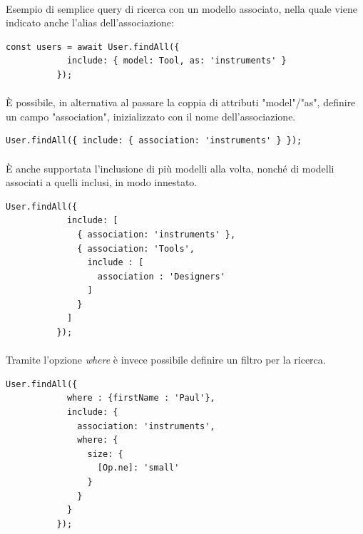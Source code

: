 \documentclass[a4paper, 12pt]{report}
\begin{document}
        \paragraph*{}
        Esempio di semplice query di ricerca con un modello associato, nella quale viene indicato anche l'alias dell'associazione:
        \begin{Verbatim}[samepage=true]
          const users = await User.findAll({
            include: { model: Tool, as: 'instruments' }
          });
        \end{Verbatim}
        \paragraph*{}
        È possibile, in alternativa al passare la coppia di attributi "model"/"as", definire un campo "association", inizializzato con il nome dell'associazione.
        \begin{Verbatim}[samepage=true]
          User.findAll({ include: { association: 'instruments' } });
        \end{Verbatim}
        \paragraph*{}
        È anche supportata l'inclusione di più modelli alla volta, nonché di modelli associati a quelli inclusi, in modo innestato.
        \begin{Verbatim}[samepage=true]
          User.findAll({ 
            include: [
              { association: 'instruments' }, 
              { association: 'Tools', 
                include : [
                  association : 'Designers'
                ]
              }
            ]
          });
        \end{Verbatim}
        \paragraph*{}
        Tramite l'opzione \emph{where} è invece possibile definire un filtro per la ricerca.
        \begin{Verbatim}[samepage=true]
          User.findAll({
            where : {firstName : 'Paul'},
            include: {
              association: 'instruments',
              where: {
                size: {
                  [Op.ne]: 'small'
                }
              }
            }
          });
        \end{Verbatim}
\end{document}
